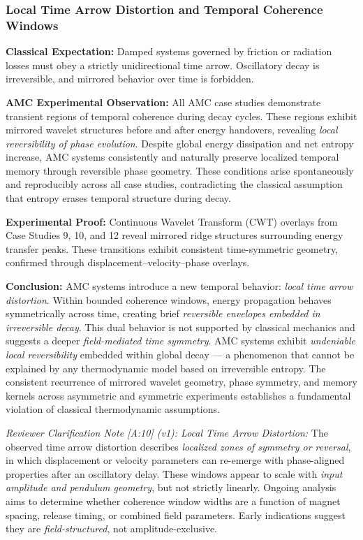\documentclass[10pt,aps,pre,onecolumn,superscriptaddress,notitlepage]{revtex4-2}
\begin{document}
\subsubsection{Local Time Arrow Distortion and Temporal Coherence Windows}
\label{sec:dev10LocalTimeArrow}


\textbf{Classical Expectation:}  
Damped systems governed by friction or radiation losses must obey a strictly unidirectional time arrow. Oscillatory decay is irreversible, and mirrored behavior over time is forbidden.

\textbf{AMC Experimental Observation:}  
All AMC case studies demonstrate transient regions of temporal coherence during decay cycles. These regions exhibit mirrored wavelet structures before and after energy handovers, revealing \textit{local reversibility of phase evolution}. Despite global energy dissipation and net entropy increase, AMC systems consistently and naturally preserve localized temporal memory through reversible phase geometry. These conditions arise spontaneously and reproducibly across all case studies, contradicting the classical assumption that entropy erases temporal structure during decay.

\textbf{Experimental Proof:}  
Continuous Wavelet Transform (CWT) overlays from Case Studies 9, 10, and 12 reveal mirrored ridge structures surrounding energy transfer peaks. These transitions exhibit consistent time-symmetric geometry, confirmed through displacement–velocity–phase overlays.

\textbf{Conclusion:}  
AMC systems introduce a new temporal behavior: \textit{local time arrow distortion}. Within bounded coherence windows, energy propagation behaves symmetrically across time, creating brief \textit{reversible envelopes embedded in irreversible decay}. This dual behavior is not supported by classical mechanics and suggests a deeper \textit{field-mediated time symmetry}. AMC systems exhibit \textit{undeniable local reversibility} embedded within global decay — a phenomenon that cannot be explained by any thermodynamic model based on irreversible entropy. The consistent recurrence of mirrored wavelet geometry, phase symmetry, and memory kernels across asymmetric and symmetric experiments establishes a fundamental violation of classical thermodynamic assumptions.

\noindent \textit{Reviewer Clarification Note [A:10] (v1): Local Time Arrow Distortion:}  
The observed time arrow distortion describes \textit{localized zones of symmetry or reversal}, in which displacement or velocity parameters can re-emerge with phase-aligned properties after an oscillatory delay. These windows appear to scale with \textit{input amplitude and pendulum geometry}, but not strictly linearly. Ongoing analysis aims to determine whether coherence window widths are a function of magnet spacing, release timing, or combined field parameters. Early indications suggest they are \textit{field-structured}, not amplitude-exclusive.
\end{document}
